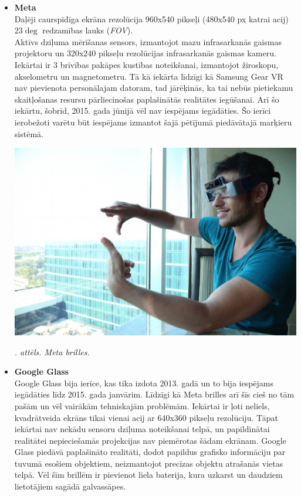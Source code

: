 \documentclass[12pt, a4paper, oneside, openright]{article}
\renewcommand{\thecimages}{\arabic{cimages}}
\begin{document}
\begin{itemize}
\item \textbf{Meta} \hfill \\
Daļēji caurspīdīga ekrāna rezolūcija 960x540 pikseļi (480x540 px katrai acij)
23$\deg$ redzamības lauks (\textit{FOV}).\\
Aktīvs dziļuma mērīšanas sensors, izmantojot mazu infrasarkanās gaismas projektoru un 320x240 pikseļu rezolūcijas infrasarkanās gaismas kameru.
Iekārtai ir 3 brīvības pakāpes kustības noteikšanai, izmantojot žiroskopu, akselometru un magnetometru.
Tā kā iekārta līdzīgi kā Samsung Gear VR nav pievienota personālajam datoram, tad jārēķinās, ka tai nebūs pietiekamu skaitļošanas resursu
pārliecinošas paplašinātās realitātes iegūšanai. Arī šo iekārtu, šobrīd, 2015. gada jūnijā vēl nav iespējams iegādāties.
Šo ierīci ierobežoti varētu būt iespējams izmantot šajā pētījumā piedāvātajā marķieru sistēmā. 

\label{cimages:meta}
\vspace{10pt}
\begin{samepage}
\begin{center}
\includegraphics[width=0.4\columnwidth]{images/meta.jpg}
\begin{center}
\footnotesize{
\textit{\thecimages. attēls. Meta brilles.}}
\end{center}
\end{center}
\end{samepage}

\item \textbf{Google Glass} \hfill \\
Google Glass bija ierīce, kas tika izdota 2013. gadā un to bija iespējams iegādāties līdz 2015. gada janvārim.
Līdzīgi kā Meta brilles arī šīs cieš no tām pašām un vēl vairākām tehniskajām problēmām. 
Iekārtai ir ļoti neliels, kvadrātveida ekrāns tikai vienai acij ar 640x360 pikseļu rezolūciju.
Tāpat iekārtai nav nekādu sensoru dziļuma noteikšanai telpā, un papildinātai
realitātei nepieciešamās projekcijas nav piemērotas šādam ekrānam. 
Google Glass piedāvā paplašināto realitāti, dodot papildus grafisko informāciju par tuvumā esošiem
objektiem, neizmantojot precīzas objektu atrašanās vietas telpā. 
Vēl šīm brillēm ir pievienot liela baterija, kura uzkarst un daudziem lietotājiem sagādā galvassāpes.


\end{itemize}
\end{document}
